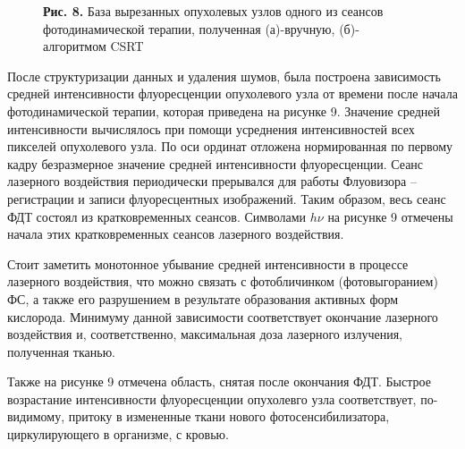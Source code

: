 \documentclass[a4paper,14pt]{extarticle}
\begin{document}
\begin{figure}[p]
\begin{minipage}[p]{0.49\linewidth}
\end{minipage}
\hfill
\begin{minipage}[h]{0.49\linewidth}
\end{minipage}
\begin{center}
   \textbf{Рис. 8.} База вырезанных опухолевых узлов одного из сеансов фотодинамической терапии, полученная (а)-вручную, (б)-алгоритмом CSRT 
\end{center}
\label{ris:image1}
\end{figure}






После структуризации данных и удаления шумов, была построена зависимость средней интенсивности флуоресценции опухолевого узла от времени после начала фотодинамической терапии, которая приведена на рисунке 9. Значение средней интенсивности вычислялось при помощи усреднения интенсивностей всех пикселей опухолевого узла. По оси ординат отложена нормированная по первому кадру безразмерное значение средней интенсивности флуоресценции. Сеанс лазерного воздействия периодически прерывался для работы Флуовизора – регистрации и записи флуоресцентных изображений. Таким образом, весь сеанс ФДТ состоял из кратковременных сеансов. Символами $h\nu$ на рисунке 9 отмечены начала этих кратковременных сеансов лазерного воздействия.  

Стоит заметить монотонное убывание средней интенсивности в процессе лазерного воздействия, что можно связать с фотобличинком (фотовыгоранием) ФС, а также его разрушением в результате образования активных форм кислорода. Минимуму данной зависимости соответствует окончание лазерного воздействия и, соответственно, максимальная доза лазерного излучения, полученная тканью. 

Также на рисунке 9 отмечена область, снятая после окончания ФДТ. Быстрое возрастание интенсивности флуоресценции опухолевго узла соответствует, по-видимому, притоку в измененные ткани нового фотосенсибилизатора, циркулирующего в организме, с кровью.







    
\end{document}
